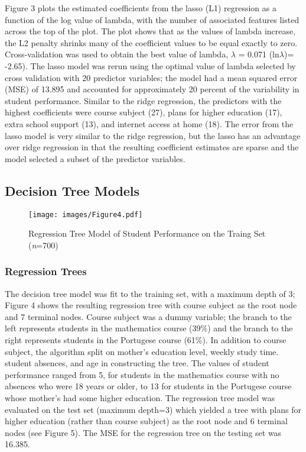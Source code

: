 \documentclass[sigconf]{acmart}
\begin{document}
Figure 3 plots the estimated coefficients from the lasso (L1) regression as 
a function of the log value of lambda, with the number of associated features 
listed across the top of the plot. The plot shows that as the values of lambda 
increase, the L2 penalty shrinks many of the coefficient values to be equal 
exactly to zero. Cross-validation was used to obtain the best value of lambda, 
$\lambda$ = 0.071 (ln$\lambda$)= -2.65). The lasso model was rerun using the 
optimal value of lambda selected by cross validation with 20 predictor 
variables; the model had a mean squared error (MSE) of 13.895 and accounted 
for approximately 20 percent of the variability in student performance. 
Similar to the ridge regression, the predictors with the highest coefficients 
were course subject (27), plans for higher education (17), extra school support 
(13), and internet access at home (18). The error from the lasso model is very 
similar to the ridge regression, but the lasso has an advantage over ridge 
regression in that the resulting coefficient estimates are sparse and the 
model selected a subset of the predictor variables. 


\subsection{Decision Tree Models}

\begin{figure}[!ht]
  \centering\texttt{[image: images/Figure4.pdf]}
  \caption{Regression Tree Model of Student Performance on the 
  Traing Set (\textit{n}=700)}
  \label{f:Figure4}
\end{figure}

\subsubsection{Regression Trees}

The decision tree model was fit to the training set, with a maximum depth of 3;
Figure 4 shows the resulting regression tree with course subject as the root 
node and 7 terminal nodes. Course subject was a dummy variable; the branch to 
the left represents students in the mathematics course (39\%) and the branch to 
the right represents students in the Portugese course (61\%). In addition to 
course subject, the algorithm split on mother's education level, weekly study 
time. student absences, and age in constructing the tree. The values of student 
performance ranged from 5, for students in the mathematics course with no 
absences who were 18 years or older, to 13 for students in the Portugese course 
whose mother's had some higher education. The regression tree model was evaluated 
on the test set (maximum depth=3) which yielded a tree with plans for higher 
education (rather than course subject) as the root node and 6 terminal nodes 
(see Figure 5). The MSE for the regression tree on the testing set was 16.385.
\end{document}
